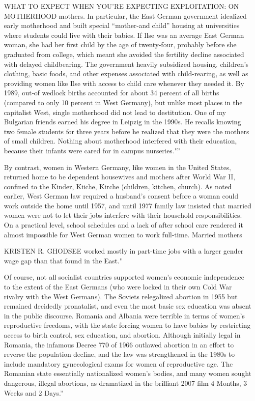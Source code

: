 WHAT TO EXPECT WHEN YOU'RE EXPECTING EXPLOITATION: ON MOTHERHOOD mothers. In particular, the East German government idealized early motherhood and built special “mother-and child” housing at universities where students could live with their babies. If Ilse was an average East German woman, she had her first child by the age of twenty-four, probably before she graduated from college, which meant she avoided the fertility decline associated with delayed childbearing. The government heavily subsidized housing, children’s clothing, basic foods, and other expenses associated with child-rearing, as well as providing women like Ilse with access to child care whenever they needed it. By 1989, out-of wedlock births accounted for about {\color{blue}34} percent of all births (compared to only {\color{blue}10} percent in West Germany), but unlike most places in the capitalist West, single motherhood did not lead to destitution. One of my Bulgarian friends earned his degree in Leipzig in the 1990s. He recalls knowing two female students for three years before he realized that they were the mothers of small children. Nothing about motherhood interfered with their education, because their infants were cared for in campus nurseries."”
 \par 
By contrast, women in Western Germany, like women in the United States, returned home to be dependent housewives and mothers after World War II, confined to the Kinder, Kiiche, Kirche (children, kitchen, church). As noted earlier, West German law required a husband’s consent before a woman could work outside the home until 1957, and until 1977 family law insisted that married women were not to let their jobs interfere with their household responsibilities. On a practical level, school schedules and a lack of after school care rendered it almost impossible for West German women to work full-time. Married mothers
 \par 
KRISTEN R. GHODSEE worked mostly in part-time jobs with a larger gender wage gap than that found in the East."
 \par 
Of course, not all socialist countries supported women’s economic independence to the extent of the East Germans (who were locked in their own Cold War rivalry with the West Germans). The Soviets relegalized abortion in 1955 but remained decidedly pronatalist, and even the most basic sex education was absent in the public discourse. Romania and Albania were terrible in terms of women’s reproductive freedoms, with the state forcing women to have babies by restricting access to birth control, sex education, and abortion. Although initially legal in Romania, the infamous Decree {\color{blue}770} of 1966 outlawed abortion in an effort to reverse the population decline, and the law was strengthened in the 1980s to include mandatory gynecological exams for women of reproductive age. The Romanian state essentially nationalized women’s bodies, and many women sought dangerous, illegal abortions, as dramatized in the brilliant 2007 film {\color{blue}4} Months, {\color{blue}3} Weeks and {\color{blue}2} Days.”
